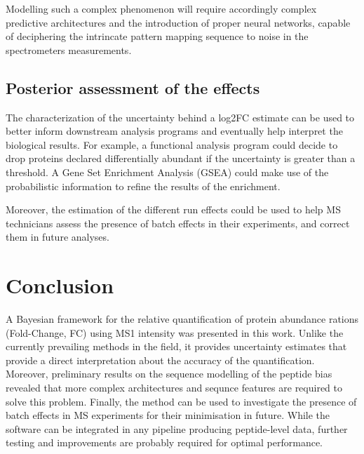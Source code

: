 Modelling such a complex phenomenon will require accordingly complex predictive architectures and the introduction of proper neural networks, capable of deciphering the intrincate pattern mapping sequence to noise in the spectrometer\textquotesingle s measurements.

\subsection{Posterior assessment of the effects}

The characterization of the uncertainty behind a \ac{log2FC} estimate can be used to better inform downstream analysis programs and eventually help interpret the biological results. For example, a functional analysis program could decide to drop proteins declared differentially abundant if the uncertainty is greater than a threshold. A Gene Set Enrichment Analysis (\ac{GSEA}) could make use of the probabilistic information to refine the results of the enrichment.

Moreover, the estimation of the different run effects could be used to help \ac{MS} technicians assess the presence of batch effects in their experiments, and correct them in future analyses.

\section{Conclusion}

A Bayesian framework for the relative quantification of protein abundance rations (Fold-Change, FC) using \ac{MS1} intensity was presented in this work. Unlike the currently prevailing methods in the field, it provides uncertainty estimates that provide a direct interpretation about the accuracy of the quantification. Moreover, preliminary results on the sequence modelling of the peptide bias revealed that more complex architectures and sequnce features are required to solve this problem. Finally, the method can be used to investigate the presence of batch effects in \ac{MS} experiments for their minimisation in future. While the software can be integrated in any pipeline producing peptide-level data, further testing and improvements are probably required for optimal performance.
